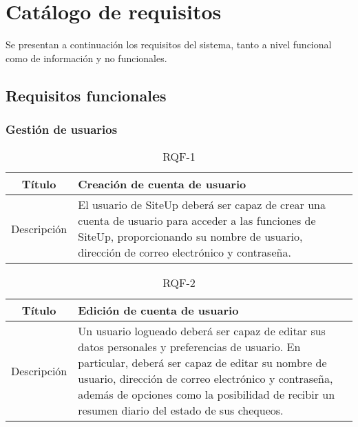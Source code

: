\section{Catálogo de requisitos}

Se presentan a continuación los requisitos del sistema, tanto a nivel funcional como de información y no funcionales.

\subsection{Requisitos funcionales}

\subsubsection{Gestión de usuarios}

\begin{table}[h!]
  \centering
  \begin{tabularx}{\textwidth}{|c|X|}
    \hline
    Título & Creación de cuenta de usuario \\

    \hline

    Descripción & El usuario de SiteUp deberá ser capaz de crear una cuenta de
    usuario para acceder a las funciones de SiteUp, proporcionando su nombre de
    usuario, dirección de correo electrónico y contraseña.\\

    \hline
  \end{tabularx}
  \caption{RQF-1}
\end{table}

\begin{table}[h!]
  \centering
  \begin{tabularx}{\textwidth}{|c|X|}
    \hline
    Título & Edición de cuenta de usuario \\

    \hline

    Descripción & Un usuario logueado deberá ser capaz de editar sus datos
    personales y preferencias de usuario. En particular, deberá ser capaz de
    editar su nombre de usuario, dirección de correo electrónico y contraseña,
    además de opciones como la posibilidad de recibir un resumen diario del
    estado de sus chequeos.\\

    \hline
  \end{tabularx}
  \caption{RQF-2}
\end{table}

